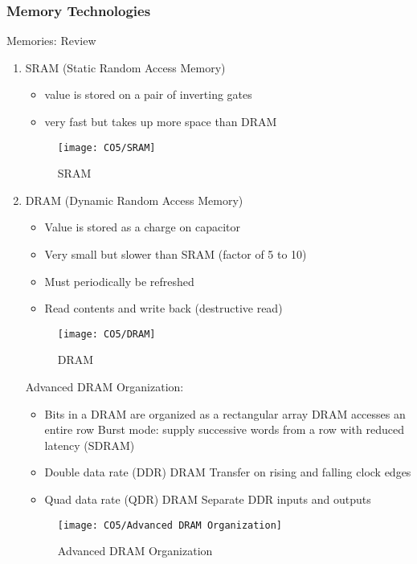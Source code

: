 \subsubsection{Memory Technologies}
Memories: Review
\begin{enumerate}\small
    \item SRAM (Static Random Access Memory)
    \begin{itemize}
        \item value is stored on a pair of inverting gates
        \item very fast but takes up more space than DRAM
    \end{itemize}
    \begin{figure}[!htb]
        \centering
        \texttt{[image: CO5/SRAM]}
        \caption{SRAM}
    \end{figure}
    \item DRAM (Dynamic Random Access Memory)
    \begin{itemize}
        \item Value is stored as a charge on capacitor
        \item Very small but slower than SRAM (factor of 5 to 10)
        \item Must periodically be refreshed
        \item Read contents and write back (destructive read)
    \end{itemize}
    \begin{figure}[!htb]
        \centering
        \texttt{[image: CO5/DRAM]}
        \caption{DRAM}
    \end{figure}
    \subitem Advanced DRAM Organization: 
    \begin{itemize}
        \item Bits in a DRAM are organized as a rectangular array
        \subitem DRAM accesses an entire row
        \subitem Burst mode: supply successive words from a row with reduced
        latency (SDRAM)
        \item Double data rate (DDR) DRAM
        \subitem Transfer on rising and falling clock edges
        \item Quad data rate (QDR) DRAM
        \subitem Separate DDR inputs and outputs
    \end{itemize}
    \begin{figure}[!htb]
        \centering
        \texttt{[image: CO5/Advanced DRAM Organization]}
        \caption{Advanced DRAM Organization}

\end{figure}
\end{enumerate}
